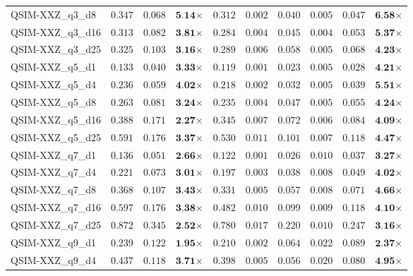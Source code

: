 \begin{table*}[t]
{\begin{tabular}{| l || r r c || r r r r r c |}
QSIM-XXZ\_q3\_d8 & $0.347$ & $0.068$ & $\textbf{5.14}$$\times$ & $0.312$ & $0.002$ & $0.040$ & $0.005$ & $0.047$ & $\textbf{6.58}$$\times$ \\
QSIM-XXZ\_q3\_d16 & $0.313$ & $0.082$ & $\textbf{3.81}$$\times$ & $0.284$ & $0.004$ & $0.045$ & $0.004$ & $0.053$ & $\textbf{5.37}$$\times$ \\
QSIM-XXZ\_q3\_d25 & $0.325$ & $0.103$ & $\textbf{3.16}$$\times$ & $0.289$ & $0.006$ & $0.058$ & $0.005$ & $0.068$ & $\textbf{4.23}$$\times$ \\
QSIM-XXZ\_q5\_d1 & $0.133$ & $0.040$ & $\textbf{3.33}$$\times$ & $0.119$ & $0.001$ & $0.023$ & $0.005$ & $0.028$ & $\textbf{4.21}$$\times$ \\
QSIM-XXZ\_q5\_d4 & $0.236$ & $0.059$ & $\textbf{4.02}$$\times$ & $0.218$ & $0.002$ & $0.032$ & $0.005$ & $0.039$ & $\textbf{5.51}$$\times$ \\
QSIM-XXZ\_q5\_d8 & $0.263$ & $0.081$ & $\textbf{3.24}$$\times$ & $0.235$ & $0.004$ & $0.047$ & $0.005$ & $0.055$ & $\textbf{4.24}$$\times$ \\
QSIM-XXZ\_q5\_d16 & $0.388$ & $0.171$ & $\textbf{2.27}$$\times$ & $0.345$ & $0.007$ & $0.072$ & $0.006$ & $0.084$ & $\textbf{4.09}$$\times$ \\
QSIM-XXZ\_q5\_d25 & $0.591$ & $0.176$ & $\textbf{3.37}$$\times$ & $0.530$ & $0.011$ & $0.101$ & $0.007$ & $0.118$ & $\textbf{4.47}$$\times$ \\
QSIM-XXZ\_q7\_d1 & $0.136$ & $0.051$ & $\textbf{2.66}$$\times$ & $0.122$ & $0.001$ & $0.026$ & $0.010$ & $0.037$ & $\textbf{3.27}$$\times$ \\
QSIM-XXZ\_q7\_d4 & $0.221$ & $0.073$ & $\textbf{3.01}$$\times$ & $0.197$ & $0.003$ & $0.038$ & $0.008$ & $0.049$ & $\textbf{4.02}$$\times$ \\
QSIM-XXZ\_q7\_d8 & $0.368$ & $0.107$ & $\textbf{3.43}$$\times$ & $0.331$ & $0.005$ & $0.057$ & $0.008$ & $0.071$ & $\textbf{4.66}$$\times$ \\
QSIM-XXZ\_q7\_d16 & $0.597$ & $0.176$ & $\textbf{3.38}$$\times$ & $0.482$ & $0.010$ & $0.099$ & $0.009$ & $0.118$ & $\textbf{4.10}$$\times$ \\
QSIM-XXZ\_q7\_d25 & $0.872$ & $0.345$ & $\textbf{2.52}$$\times$ & $0.780$ & $0.017$ & $0.220$ & $0.010$ & $0.247$ & $\textbf{3.16}$$\times$ \\
QSIM-XXZ\_q9\_d1 & $0.239$ & $0.122$ & $\textbf{1.95}$$\times$ & $0.210$ & $0.002$ & $0.064$ & $0.022$ & $0.089$ & $\textbf{2.37}$$\times$ \\
QSIM-XXZ\_q9\_d4 & $0.437$ & $0.118$ & $\textbf{3.71}$$\times$ & $0.398$ & $0.005$ & $0.056$ & $0.020$ & $0.080$ & $\textbf{4.95}$$\times$ \\

\end{tabular}}
\end{table*}
